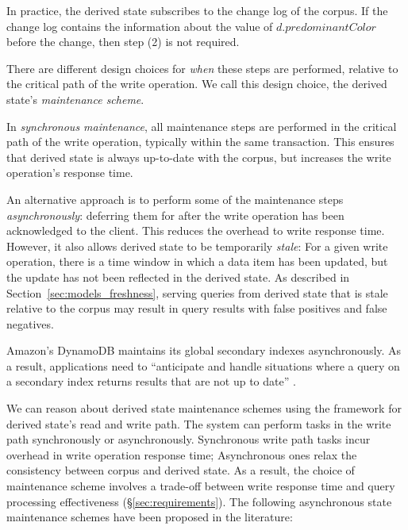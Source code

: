 In practice, the derived state subscribes to the change log of the corpus.
If the change log contains the information about the value of $d.predominantColor$ before the change, then step (2) is not
required.

There are different design choices for \textit{when} these steps are performed, relative to the critical
path of the write operation.
We call this design choice, the derived state's \textit{maintenance scheme}.

In \textit{synchronous maintenance}, all maintenance steps are performed in the critical path of the write operation,
typically within the same transaction.
This ensures that derived state is always up-to-date with the corpus,
but increases the write operation's response time.

An alternative approach is to perform some of the maintenance steps \textit{asynchronously}:
deferring them for after the write operation has been acknowledged to the client.
This reduces the overhead to write response time.
However, it also allows derived state to be temporarily \textit{stale}:
For a given write operation, there is a time window in which a data item has been updated,
but the update has not been reflected in the derived state.
As described in Section~\ref{sec:models_freshness},
serving queries from derived state that is stale relative to the corpus may result in query results with false positives
and false negatives.

Amazon's DynamoDB maintains its global secondary indexes asynchronously.
As a result, applications need to ``anticipate and handle situations where a query on a secondary index returns results that are
not up to date'' \cite{dynamodb:async}.

We can reason about derived state maintenance schemes using the framework for derived state's read and write path.
The system can perform tasks in the write path synchronously or asynchronously.
Synchronous write path tasks incur overhead in write operation response time;
Asynchronous ones relax the consistency between corpus and derived state.
As a result, the choice of maintenance scheme involves a trade-off between write response time and query processing effectiveness (\S\ref{sec:requirements}).
The following asynchronous state maintenance schemes have been proposed in the literature:



